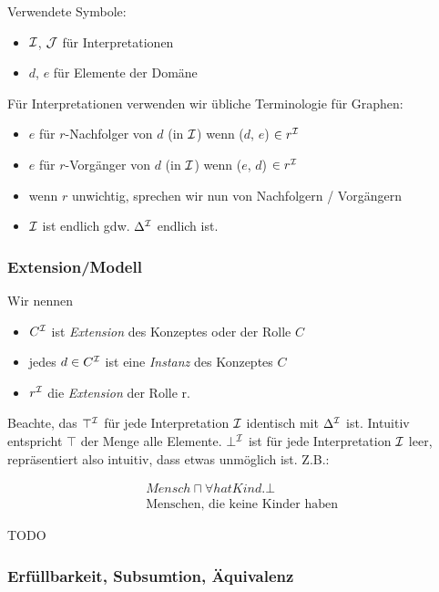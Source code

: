Verwendete Symbole:

\begin{itemize}
  \item $\mathcal{I}$, $\mathcal{J}$ für Interpretationen
  \item $d$, $e$ für Elemente der Domäne
\end{itemize}

Für Interpretationen verwenden wir übliche Terminologie für Graphen:

\begin{itemize}
  \item $e$ für $r$-Nachfolger von $d$ (in $\mathcal{I}$) wenn ($d$, $e$) $\in r^{\mathcal{I}}$
  \item $e$ für $r$-Vorgänger von $d$ (in $\mathcal{I}$) wenn ($e$, $d$) $\in r^{\mathcal{I}}$
  \item wenn $r$ unwichtig, sprechen wir nun von Nachfolgern / Vorgängern
  \item $\mathcal{I}$ ist endlich gdw. $\Delta^{\mathcal{I}}$ endlich ist.
\end{itemize}

\subsubsection{Extension/Modell}
\label{sec:exetension}

Wir nennen
\begin{itemize}
\item
  $C^{\mathcal{I}}$ ist \emph{Extension} des Konzeptes oder der Rolle $C$
\item
    jedes $d \in C^{\mathcal{I}}$ ist eine \emph{Instanz} des Konzeptes $C$
\item $r^{\mathcal{I}}$ die \emph{Extension} der Rolle r.
\end{itemize}

Beachte, das $\top^{\mathcal{I}}$ für jede Interpretation $\mathcal{I}$ identisch mit
$\Delta^{\mathcal{I}}$ ist. Intuitiv entspricht $\top$ der Menge alle Elemente.
$\bot^{\mathcal{I}}$ ist für jede Interpretation $\mathcal{I}$ leer, repräsentiert also
intuitiv, dass etwas unmöglich ist. Z.B.:

\begin{align*}
    &\mathit{Mensch} \sqcap \forall \mathit{hatKind}.\bot\\
    &\text{Menschen, die keine Kinder haben}
\end{align*}

\begin{tafel}
    TODO
\end{tafel}

\subsubsection{Erfüllbarkeit, Subsumtion, Äquivalenz}
\label{sec:erfull-subsum-equiv}
\label{erfuxfcllbarkeit-subsumtion-uxe4quivalenz}

